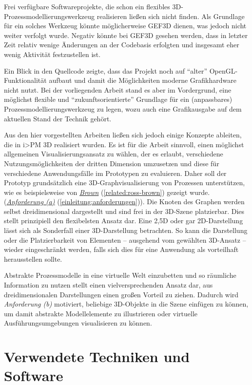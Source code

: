\documentclass[a4paper,10pt]{sphinxmanual}
\begin{document}
Frei verfügbare Softwareprojekte, die schon ein flexibles 3D-Prozessmodellierungswerkzeug realisieren ließen sich nicht finden.
Als Grundlage für ein solches Werkzeug könnte möglicherweise GEF3D dienen, was jedoch nicht weiter verfolgt wurde.
Negativ könnte bei GEF3D gesehen werden, dass in letzter Zeit relativ wenige Änderungen an der Codebasis erfolgten und insgesamt eher wenig Aktivität festzustellen ist.

Ein Blick in den Quellcode zeigte, dass das Projekt noch auf "`alter"' OpenGL-Funktionalität aufbaut und damit die Möglichkeiten moderne Grafikhardware nicht nutzt.
Bei der vorliegenden Arbeit stand es aber im Vordergrund, eine möglichst flexible und "`zukunftsorientierte"' Grundlage für ein (anpassbares) Prozessmodellierungswerkzeug zu legen, wozu auch eine Grafikausgabe auf dem aktuellen Stand der Technik gehört.

Aus den hier vorgestellten Arbeiten ließen sich jedoch einige Konzepte ableiten, die in i\textgreater{}PM 3D realisiert wurden.
Es ist für die Arbeit sinnvoll, einen möglichst allgemeinen Visualisierungsansatz zu wählen, der es erlaubt, verschiedene Nutzungsmöglichkeiten der dritten Dimension umzusetzen und diese für verschiedene Anwendungsfälle im Prototypen zu evaluieren.
Daher soll der Prototyp grundsätzlich eine 3D-Graphvisualisierung von Prozessen unterstützen, wie es beispielsweise von {\hyperref[related:ross-brown]{\emph{Brown}}} (\autoref*{related:ross-brown}) gezeigt wurde. ({\hyperref[einleitung:anforderungen]{\emph{Anforderung (a)}}} (\autoref*{einleitung:anforderungen})).
Die Knoten des Graphen werden selbst dreidimensional dargestellt und sind frei in der 3D-Szene platzierbar. Dies stellt prinzipiell den flexibelsten Ansatz dar.
Eine 2,5D oder gar 2D-Darstellung lässt sich als Sonderfall einer 3D-Darstellung betrachten.
So kann die Darstellung oder die Platzierbarkeit von Elementen – ausgehend vom gewählten 3D-Ansatz – wieder eingeschränkt werden, falls sich dies für eine Anwendung als vorteilhaft herausstellen sollte.

Abstrakte Prozessmodelle in eine virtuelle Welt einzubetten und so räumliche Information zu nutzen stellt einen vielversprechenden Ansatz dar, aus dreidimensionalen Darstellungen einen großen Vorteil zu ziehen.
Dadurch wird \emph{Anforderung (b)} motiviert, beliebige 3D-Objekte in die Szene einfügen zu können, um damit abstrakte Modellelemente zu illustrieren oder virtuelle Ausführungsumgebungen visualisieren zu können.


\chapter{Verwendete Techniken und Software}
\label{verwendet::doc}\label{verwendet:verwendete-techniken-und-software}
\end{document}
